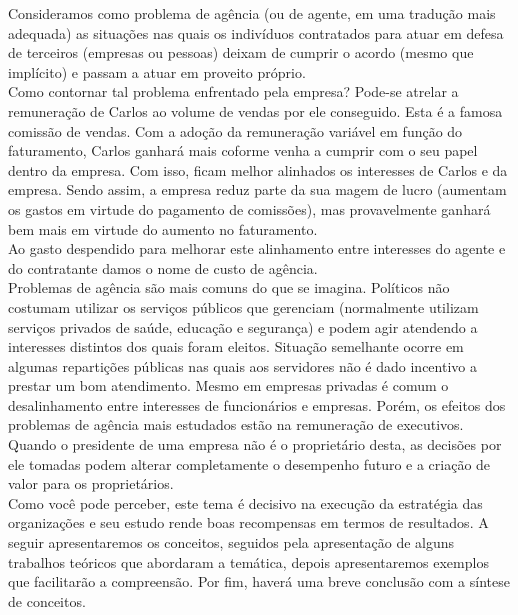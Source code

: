 \documentclass[jou,apacite]{apa6}
\begin{document}
Consideramos como problema de agência (ou de agente, em uma tradução mais adequada) as situações nas quais os indivíduos contratados para atuar em defesa de terceiros (empresas ou pessoas) deixam de cumprir o acordo (mesmo que implícito) e passam a atuar em proveito próprio.\\
Como contornar tal problema enfrentado pela empresa? Pode-se atrelar a remuneração de Carlos ao volume de vendas por ele conseguido. Esta é a famosa comissão de vendas. Com a adoção da remuneração variável em função do faturamento, Carlos ganhará mais coforme venha a cumprir com o seu papel dentro da empresa. Com isso, ficam melhor alinhados os interesses de Carlos e da empresa. Sendo assim, a empresa reduz parte da sua magem de lucro (aumentam os gastos em virtude do pagamento de comissões), mas provavelmente ganhará bem mais em virtude do aumento no faturamento.\\
Ao gasto despendido para melhorar este alinhamento entre interesses do agente e do contratante damos o nome de custo de agência.\\
Problemas de agência são mais comuns do que se imagina. Políticos não costumam utilizar os serviços públicos que gerenciam (normalmente utilizam serviços privados de saúde, educação e segurança) e podem agir atendendo a interesses distintos dos quais foram eleitos. Situação semelhante ocorre em algumas repartições públicas nas quais aos servidores não é dado incentivo a prestar um bom atendimento. Mesmo em empresas privadas é comum o desalinhamento entre interesses de funcionários e empresas. Porém, os efeitos dos problemas de agência mais estudados estão na remuneração de executivos. Quando o presidente de uma empresa não é o proprietário desta, as decisões por ele tomadas podem alterar completamente o desempenho futuro e a criação de valor para os proprietários.\\
Como você pode perceber, este tema é decisivo na execução da estratégia das organizações e seu estudo rende boas recompensas em termos de resultados. A seguir apresentaremos os conceitos, seguidos pela apresentação de alguns trabalhos teóricos que abordaram a temática, depois apresentaremos exemplos que facilitarão a compreensão. Por fim, haverá uma breve conclusão com a síntese de conceitos.
\end{document}

